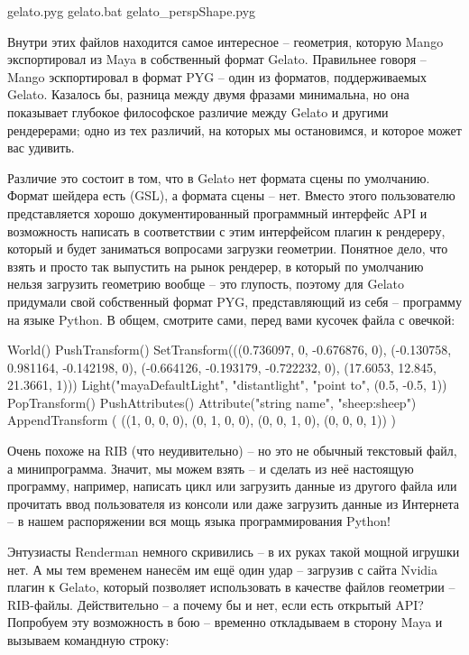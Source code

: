 gelato.pyg
gelato.bat
gelato\_perspShape.pyg
  

 Внутри этих файлов находится самое интересное –
    геометрия, которую Mango экспортировал из Maya в собственный формат
    Gelato. Правильнее говоря – Mango эскпортировал в формат PYG – один
    из форматов, поддерживаемых Gelato. Казалось бы, разница между
    двумя фразами минимальна, но она показывает глубокое философское
    различие между Gelato и другими рендерерами; одно из тех различий,
    на которых мы остановимся, и которое может вас удивить.
  

 Различие это состоит в том, что в Gelato нет
    формата сцены по умолчанию. Формат шейдера есть (GSL), а формата
    сцены – нет. Вместо этого пользователю представляется хорошо
    документированный программный интерфейс API и возможность написать
    в соответствии с этим интерфейсом плагин к рендереру,
    который  и будет
    заниматься вопросами загрузки геометрии. Понятное дело, что взять и
    просто так выпустить на рынок рендерер, в который по умолчанию
    нельзя загрузить геометрию вообще – это глупость, поэтому для
    Gelato придумали свой собственный формат PYG, представляющий из
    себя – программу на языке Python. В общем, смотрите сами, перед
    вами кусочек файла с овечкой:
  

World()
PushTransform()
SetTransform(((0.736097, 0, -0.676876, 0),
                (-0.130758, 0.981164, -0.142198, 0),
                (-0.664126, -0.193179, -0.722232, 0),
                (17.6053, 12.845, 21.3661, 1)))
Light("mayaDefaultLight", "distantlight", "point to", (0.5, -0.5, 1))
PopTransform()
PushAttributes()
Attribute("string name", "sheep:sheep")
AppendTransform ( ((1, 0, 0, 0),
                    (0, 1, 0, 0),
                    (0, 0, 1, 0),
                    (0, 0, 0, 1)) )
  

 Очень похоже на RIB (что неудивительно) – но это не
    обычный текстовый файл, а минипрограмма. Значит, мы можем взять – и
    сделать из неё настоящую программу, например, написать цикл или
    загрузить данные из другого файла или прочитать ввод пользователя
    из консоли или даже загрузить данные из Интернета – в нашем
    распоряжении вся мощь языка программирования Python!
  

 Энтузиасты Renderman немного скривились – в их
    руках такой мощной игрушки нет. А мы тем временем нанесём им ещё
    один удар – загрузив с сайта Nvidia плагин к Gelato, который
    позволяет использовать в качестве файлов геометрии – RIB-файлы.
    Действительно – а почему бы и нет, если есть открытый API?
    Попробуем эту возможность в бою – временно откладываем в сторону
    Maya и вызываем командную строку:
  

